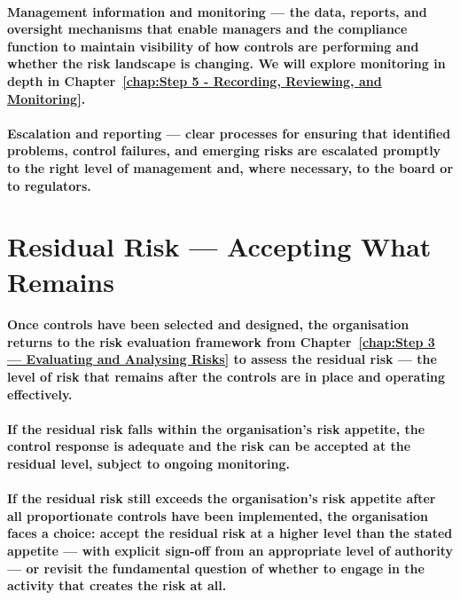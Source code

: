 \paragraph{\textbf{Management information and monitoring} — the data, reports, and oversight mechanisms that enable managers and the compliance function to maintain visibility of how controls are performing and whether the risk landscape is changing. We will explore monitoring in depth in Chapter~\ref{chap:Step 5 - Recording, Reviewing, and Monitoring}.}
\paragraph{\textbf{Escalation and reporting} — clear processes for ensuring that identified problems, control failures, and emerging risks are escalated promptly to the right level of management and, where necessary, to the board or to regulators.}

\section{Residual Risk — Accepting What Remains}
\paragraph{Once controls have been selected and designed, the organisation returns to the risk evaluation framework from Chapter~\ref{chap:Step 3 — Evaluating and Analysing Risks} to assess the \textbf{residual risk} — the level of risk that remains after the controls are in place and operating effectively.}
\paragraph{If the residual risk falls within the organisation's risk appetite, the control response is adequate and the risk can be accepted at the residual level, subject to ongoing monitoring.}
\paragraph{If the residual risk still exceeds the organisation's risk appetite after all proportionate controls have been implemented, the organisation faces a choice: accept the residual risk at a higher level than the stated appetite — with explicit sign-off from an appropriate level of authority — or revisit the fundamental question of whether to engage in the activity that creates the risk at all.}
